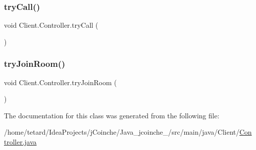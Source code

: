 \mbox{\label{classClient_1_1Controller_ab188da27fe6cdc563242921dc3028764}} 
\subsubsection{\texorpdfstring{try\+Call()}{tryCall()}}
{\footnotesize\ttfamily void Client.\+Controller.\+try\+Call (\begin{DoxyParamCaption}{ }\end{DoxyParamCaption})\hspace{0.3cm}{\ttfamily [inline]}}

\mbox{\label{classClient_1_1Controller_af60204a5c842fb77982ae3e8e6635f62}} 
\subsubsection{\texorpdfstring{try\+Join\+Room()}{tryJoinRoom()}}
{\footnotesize\ttfamily void Client.\+Controller.\+try\+Join\+Room (\begin{DoxyParamCaption}{ }\end{DoxyParamCaption})\hspace{0.3cm}{\ttfamily [inline]}}



The documentation for this class was generated from the following file\+:\begin{DoxyCompactItemize}
\item 
/home/tetard/\+Idea\+Projects/j\+Coinche/\+Java\+\_\+jcoinche\+\_/src/main/java/\+Client/\mbox{\hyperlink{Controller_8java}{Controller.\+java}}\end{DoxyCompactItemize}
